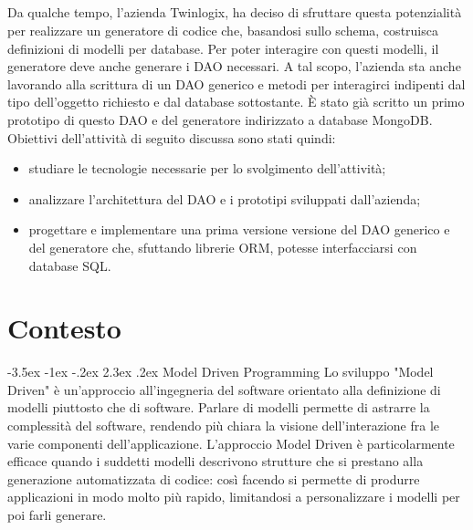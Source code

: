\documentclass[a4paper, 12pt]{report}
\begin{document}
    \paragraph*{}Da qualche tempo, l'azienda Twinlogix, ha deciso di sfruttare questa potenzialità per realizzare un generatore di codice che, basandosi sullo schema, costruisca definizioni di modelli per database.
    Per poter interagire con questi modelli, il generatore deve anche generare i DAO necessari.
    A tal scopo, l'azienda sta anche lavorando alla scrittura di un DAO generico e metodi per interagirci indipenti dal tipo dell'oggetto richiesto e dal database sottostante.
    È stato già scritto un primo prototipo di questo DAO e del generatore indirizzato a database MongoDB.
    Obiettivi dell'attività di seguito discussa sono stati quindi:
    \begin{itemize}
      \item studiare le tecnologie necessarie per lo svolgimento dell'attività;
      \item analizzare l'architettura del DAO e i prototipi sviluppati dall'azienda;
      \item progettare e implementare una prima versione versione del DAO generico e del generatore che, sfuttando librerie ORM, potesse interfacciarsi con database SQL.
    \end{itemize}
    \renewcommand\section{\@startsection{section}{1}{\z@}%
    {-3.5ex \@plus -1ex \@minus -.2ex}%
    {2.3ex \@plus.2ex}%
    {\normalfont\large\bfseries}}
  \newpage
  \tableofcontents
  \newpage
  \listoffigures
  \chapter{Contesto}
    \section{Model Driven Programming}
      Lo sviluppo "Model Driven" è un'approccio all'ingegneria del software orientato alla definizione di modelli piuttosto che di software.
      Parlare di modelli permette di astrarre la complessità del software, rendendo più chiara la visione dell'interazione fra le varie componenti dell'applicazione.
      L'approccio Model Driven è particolarmente efficace quando i suddetti modelli descrivono strutture che si prestano alla generazione automatizzata di codice: così facendo si permette di produrre applicazioni in modo molto più rapido, limitandosi a personalizzare
      i modelli per poi farli generare.
\end{document}

